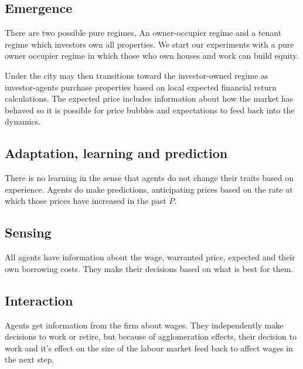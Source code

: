 \subsection{Emergence}
There are two possible pure regimes, An owner-occupier regime and a tenant regime which investors own all properties. We start our experiments with a pure owner occupier regime in which those who own houses and work can build equity.  

Under the city may then transitions toward  the investor-owned regime  as investor-agents purchase properties based on local expected financial return calculations.  
The expected price includes information about how the market has behaved so it is possible for price bubbles and expectations to feed back into the dynamics. 

\subsection{Adaptation, learning and prediction}



There is no learning in the sense that agents do not change their traits based on experience. 
Agents do make predictions, anticipating prices based on the rate at which those prices have increased in the past $\dot P$.

\subsection{Sensing}
All agents have information about the wage, warranted price, expected and their own borrowing costs. They make their decisions based on what is best for them. 

\subsection{Interaction}
Agents get information from the firm about wages. They independently make decisions to work or retire, but because of agglomeration effects, their decision to work and it's effect on the size of the labour market feed back to affect wages in the next step. 

